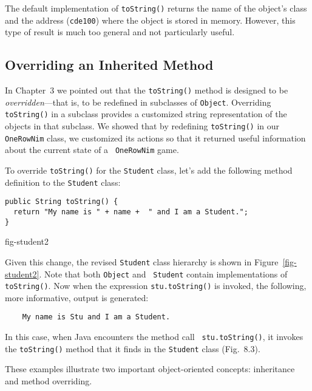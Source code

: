\noindent The default implementation of {\tt toString()} returns the
name of the object's class and the address ({\tt cde100}) where the
object is stored in memory. However, this type of result is much too
general and not particularly useful.

\subsection{Overriding an Inherited Method}

In Chapter~3 we pointed out that the {\tt toString()} method is
designed to be {\em overridden}---that is, to be redefined in
subclasses of {\tt Object}. Overriding {\tt toString()} in a subclass
provides a customized string representation of the objects in that
subclass.  We showed that by redefining {\tt toString()} in our {\tt
OneRowNim} class, we customized its actions so that it returned
useful information about the current state of a {\tt
OneRowNim} game.

To override {\tt toString()} for the {\tt Student} class, let's add
the following method definition to the {\tt Student} class:

\begin{jjjlisting}
\begin{lstlisting}
public String toString() {
  return "My name is " + name +  " and I am a Student.";
}
\end{lstlisting}
\end{jjjlisting}

{fig-student2}


\noindent Given this change, the revised {\tt Student} class hierarchy
is shown in Figure~\ref{fig-student2}.  Note that both {\tt Object} and {\tt
Student} contain implementations of {\tt toString()}. Now when the
expression {\tt stu.toString()} is invoked, the following, more
informative, output is generated:

\begin{jjjlisting}
\begin{lstlisting}
    My name is Stu and I am a Student.
\end{lstlisting}
\end{jjjlisting}

\noindent In this case, when Java encounters the method call {\tt
stu.toString()}, it invokes the {\tt toString()} method that it finds
in the {\tt Student} class (Fig.~8.3).

These examples illustrate two important object-oriented concepts:
inheritance and method overriding.


